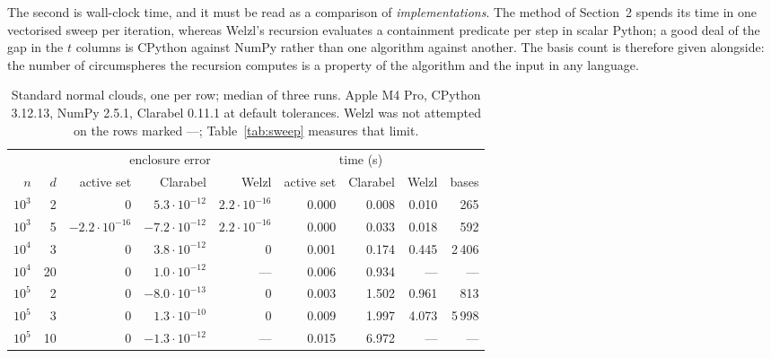 \documentclass[10pt,a4paper]{article}
\theoremstyle{plain}
\theoremstyle{remark}
\begin{document}
The second is wall-clock time, and it must be read as a comparison of
\emph{implementations}. The method of Section~2 spends its time in one vectorised
sweep per iteration, whereas Welzl's recursion evaluates a containment predicate
per step in scalar Python; a good deal of the gap in the $t$ columns is CPython
against NumPy rather than one algorithm against another. The basis count is
therefore given alongside: the number of circumspheres the recursion computes is
a property of the algorithm and the input in any language.

\begin{table}[h]
\centering
\small
\begin{tabular}{rr rrr rrr r}
  \toprule
  & & \multicolumn{3}{c}{enclosure error} & \multicolumn{3}{c}{time (s)} & \\
  \cmidrule(lr){3-5}\cmidrule(lr){6-8}
  $n$ & $d$ & active set & Clarabel & Welzl & active set & Clarabel & Welzl & bases \\
  \midrule
  $10^3$ &  2 & $0$                 & $5.3\cdot10^{-12}$  & $2.2\cdot10^{-16}$ & 0.000 & 0.008 & 0.010 & 265 \\
  $10^3$ &  5 & $-2.2\cdot10^{-16}$ & $-7.2\cdot10^{-12}$ & $2.2\cdot10^{-16}$ & 0.000 & 0.033 & 0.018 & 592 \\
  $10^4$ &  3 & $0$                 & $3.8\cdot10^{-12}$  & $0$                & 0.001 & 0.174 & 0.445 & 2\,406 \\
  $10^4$ & 20 & $0$                 & $1.0\cdot10^{-12}$  & ---                & 0.006 & 0.934 & ---   & --- \\
  $10^5$ &  2 & $0$                 & $-8.0\cdot10^{-13}$ & $0$                & 0.003 & 1.502 & 0.961 & 813 \\
  $10^5$ &  3 & $0$                 & $1.3\cdot10^{-10}$  & $0$                & 0.009 & 1.997 & 4.073 & 5\,998 \\
  $10^5$ & 10 & $0$                 & $-1.3\cdot10^{-12}$ & ---                & 0.015 & 6.972 & ---   & --- \\
  \bottomrule
\end{tabular}
\caption{Standard normal clouds, one per row; median of three runs. Apple M4 Pro,
CPython 3.12.13, NumPy 2.5.1, Clarabel 0.11.1 at default tolerances. Welzl was
not attempted on the rows marked ---; Table~\ref{tab:sweep} measures that limit.}
\label{tab:bench}
\end{table}
\end{document}
